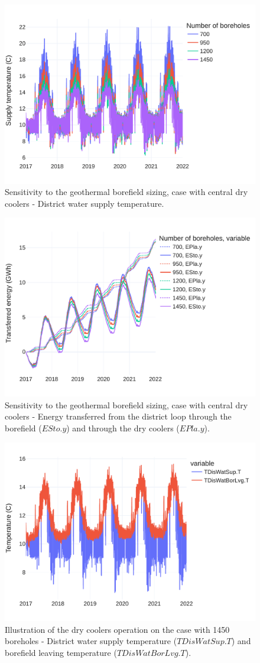 \begin{figure}[!htbp]
    \centering
    \includegraphics[width=.7\linewidth]{../python_scripts/figures/GeoSizing.pdf}
    \caption{Sensitivity to the geothermal borefield sizing, case with central dry coolers - District water supply temperature.}
    \label{fig:geo_sizing_tsup}
\end{figure}

\begin{figure}[!htbp]
    \centering
    \includegraphics[width=.7\linewidth]{../python_scripts/figures/GeoSizingE.pdf}
    \caption{Sensitivity to the geothermal borefield sizing, case with central dry coolers - Energy transferred from the district loop through the borefield ($ESto.y$) and through the dry coolers ($EPla.y$).}
    \label{fig:geo_sizing_energy}
\end{figure}

\begin{figure}[!htbp]
    \centering
    \includegraphics[width=.7\linewidth]{../python_scripts/figures/GeoBestCaseT.pdf}
    \caption{Illustration of the dry coolers operation on the case with 1450 boreholes - District water supply temperature ($TDisWatSup.T$) and borefield leaving temperature ($TDisWatBorLvg.T$).}
    \label{fig:coolers_tsup}
\end{figure}

